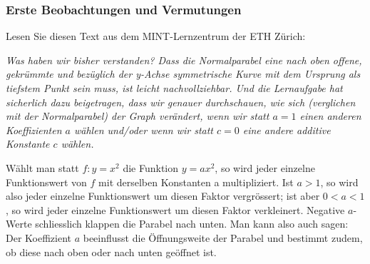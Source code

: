 \subsubsection{Erste Beobachtungen und Vermutungen}
Lesen Sie diesen Text aus dem MINT-Lernzentrum der ETH Zürich:
\bigskip

{\it
    Was haben wir bisher verstanden? Dass die Normalparabel eine nach oben offene, gekrümmte und bezüglich der y-Achse symmetrische Kurve mit dem Ursprung als tiefstem Punkt sein muss, ist leicht nachvollziehbar. Und die Lernaufgabe hat sicherlich dazu beigetragen, dass wir genauer durchschauen, wie sich (verglichen mit der Normalparabel) der Graph verändert, wenn wir statt $a=1$ einen anderen Koeffizienten $a$ wählen und/oder wenn wir statt $c=0$ eine andere additive Konstante $c$ wählen.
    \medskip

    Wählt man statt $f:y=x^2$  die Funktion $y=ax^2$, so wird jeder einzelne Funktionswert von $f$ mit derselben Konstanten a multipliziert. Ist $a>1$, so wird also jeder einzelne Funktionswert um diesen Faktor vergrössert; ist aber $0<a<1$, so wird jeder einzelne Funktionswert um diesen Faktor verkleinert. Negative $a$-Werte schliesslich \glqq klappen\grqq{} die Parabel nach unten. Man kann also auch sagen: Der Koeffizient $a$ beeinflusst die \glqq Öffnungsweite\grqq{} der Parabel und bestimmt zudem, ob diese nach oben oder nach unten geöffnet ist.
}


